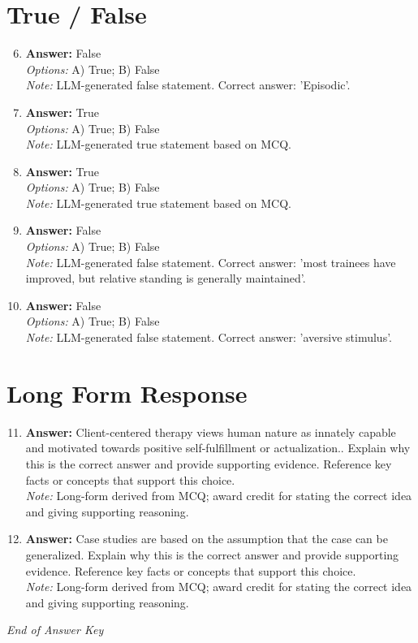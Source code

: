 \documentclass[12pt]{article}
\begin{document}
\section*{True / False}
\begin{enumerate}[label=\arabic*.]
\setcounter{enumi}{5}
\item \textbf{Answer:} False
\\ \textit{Options:} A) True; B) False
\\ \textit{Note:} LLM-generated false statement. Correct answer: 'Episodic'.
\item \textbf{Answer:} True
\\ \textit{Options:} A) True; B) False
\\ \textit{Note:} LLM-generated true statement based on MCQ.
\item \textbf{Answer:} True
\\ \textit{Options:} A) True; B) False
\\ \textit{Note:} LLM-generated true statement based on MCQ.
\item \textbf{Answer:} False
\\ \textit{Options:} A) True; B) False
\\ \textit{Note:} LLM-generated false statement. Correct answer: 'most trainees have improved, but relative standing is generally maintained'.
\item \textbf{Answer:} False
\\ \textit{Options:} A) True; B) False
\\ \textit{Note:} LLM-generated false statement. Correct answer: 'aversive stimulus'.
\end{enumerate}

\section*{Long Form Response}
\begin{enumerate}[label=\arabic*.]
\setcounter{enumi}{10}
\item \textbf{Answer:} Client-centered therapy views human nature as innately capable and motivated towards positive self-fulfillment or actualization.. Explain why this is the correct answer and provide supporting evidence. Reference key facts or concepts that support this choice.
\\ \textit{Note:} Long-form derived from MCQ; award credit for stating the correct idea and giving supporting reasoning.
\item \textbf{Answer:} Case studies are based on the assumption that the case can be generalized. Explain why this is the correct answer and provide supporting evidence. Reference key facts or concepts that support this choice.
\\ \textit{Note:} Long-form derived from MCQ; award credit for stating the correct idea and giving supporting reasoning.
\end{enumerate}

\vfill
\noindent\textit{End of Answer Key}
\end{document}
